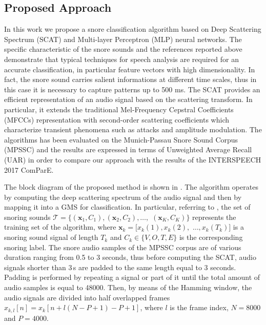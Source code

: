 \subsection{Proposed Approach}
In this work we propose a snore classification algorithm based on Deep Scattering Spectrum (SCAT) \cite{anden2014deep}  and Multi-layer Perceptron (MLP) neural networks. 
The specific characteristic of the snore sounds and the references reported above demonstrate that typical techniques for speech analysis are required for an accurate classification, in particular feature vectors with high dimensionality. 
In fact, the snore sound carries salient informations at different time scales, thus in this case it is necessary to capture patterns up to 500 ms. The SCAT provides an efficient representation of an audio signal based on the scattering transform. In particular, it extends the traditional Mel-Frequency Cepstral Coefficients (MFCCs) representation  \cite{Davis80-COP}  with second-order scattering coefficients which characterize transient phenomena such as attacks and amplitude modulation.
The algorithms has been evaluated on the Munich-Passau Snore Sound Corpus (MPSSC) \cite{ComParE2017} and the results are expressed in terms of Unweighted Average Recall (UAR) in order to compare our approach with the results of the INTERSPEECH 2017 ComParE.

The block diagram of the proposed method is shown in . The algorithm operates by computing the deep scattering spectrum of the audio signal and then by mapping it into a GMS \cite{Kinnunen2010} for classification. In particular, referring to , the set of snoring sounds  $\mathcal{T}=\{(\mathbf{x}_1, C_1),(\mathbf{x}_2, C_2), \ldots,$ $ (\mathbf{x}_K, C_K)\}$  represents the training set of the algorithm, where $\mathbf{x}_k=[x_k(1), x_k(2),$ $\ldots, x_k(T_k)]$ is a snoring sound signal of length $T_k$ and $C_k \in \{V, O, T, E\}$ is the corresponding snoring label. 
The snore audio samples of the MPSSC corpus are of various duration ranging from 0.5 to 3 seconds, thus before computing the SCAT, audio signals shorter than 3\,s are padded to the same length equal to 3 seconds. Padding is performed by repeating a signal or part of it until the total amount of audio samples is equal to 48000. Then, by means of the Hamming window, the audio signals are divided into half overlapped frames ${x}_{k,l}[n] = {x}_{k}[n + l (N - P + 1) - P + 1]$, where $l$ is the frame index, $N=8000$ and $P=4000$.

